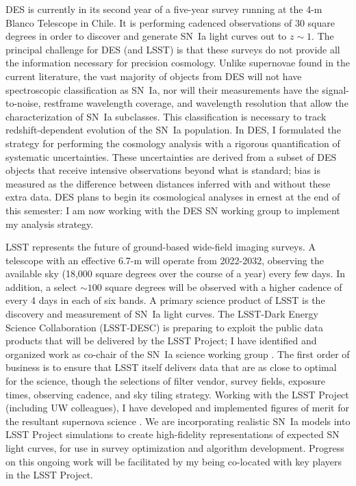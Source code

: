\documentclass{article}
\begin{document}
DES is currently in its second year of a five-year survey running at the 4-m Blanco Telescope in Chile.  It is performing
cadenced observations of 30 square degrees in order to discover and generate SN~Ia light curves out
to $z\sim1$.
The principal challenge for DES (and LSST) is that these surveys do
not provide all the information necessary for precision cosmology.
Unlike  supernovae found in the current literature, the vast majority of objects from DES
will not have spectroscopic classification as SN~Ia, nor will their
measurements have the signal-to-noise, restframe wavelength coverage, and wavelength resolution that allow 
the characterization of SN~Ia subclasses.  This classification is necessary to track redshift-dependent evolution of 
the SN~Ia population.  In DES, I  formulated the strategy for performing the cosmology analysis
with a rigorous quantification of systematic uncertainties.  These uncertainties are  derived from a subset of 
DES objects that receive intensive observations beyond what is standard;
bias is measured as the difference between distances inferred with
and without these extra data. 
DES plans to begin its cosmological analyses in ernest at the end
of this semester: I am now  working with the DES SN working group to implement my analysis strategy.

LSST  represents the future of ground-based wide-field imaging surveys.
A telescope with an effective 6.7-m will operate from 2022-2032, observing the available sky (18,000 square degrees over the course
of a year)
every few days.  In addition, a select $\sim 100$ square degrees will be observed with a higher cadence of every 4 days
in each of six bands.
A primary science product of LSST is the discovery and measurement of SN~Ia light curves.
The LSST-Dark Energy Science Collaboration (LSST-DESC) is preparing
to exploit  the public data products that will be
delivered by the  LSST Project;  I have identified and organized
work as co-chair of the SN~Ia science working group \cite{2012arXiv1211.0310L}.
The first order of business is to ensure that LSST itself delivers data that are as close to optimal for the science, though
the selections of filter vendor, survey fields, exposure times, observing cadence, and sky tiling strategy.
Working with the LSST Project (including UW colleagues), I have developed and implemented figures of merit for the resultant supernova science
\cite{LSSTCadence}.  
We are incorporating realistic SN~Ia models  into LSST Project simulations to create high-fidelity representations
of expected SN light curves, for use in survey optimization and algorithm development.  Progress on this ongoing work will be
facilitated by my being co-located with key players in the LSST Project.
\end{document}
